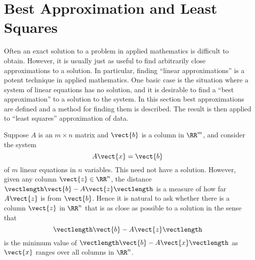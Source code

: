 \section{Best Approximation and Least Squares}
\label{sec:5_6}

Often an exact solution to a problem in applied mathematics is difficult to obtain. However, it is usually just as useful to find arbitrarily close approximations to a solution. In particular, finding ``linear approximations'' is a potent technique in applied mathematics. One basic case is the situation where a system of linear equations has no solution, and it is desirable to find a ``best approximation'' to a solution to the system. In this section best approximations are defined and a method for finding them is described. The result is then applied to ``least squares'' approximation of data.

Suppose $A$ is an $m \times n$ matrix and $\vect{b}$ is a column in $\RR^m$, and consider the system
\begin{equation*}
A\vect{x} = \vect{b}
\end{equation*}
of $m$ linear equations in $n$ variables. This need not have a solution. However, given any column $\vect{z} \in \RR^n$, the distance $\vectlength\vect{b} - A\vect{z}\vectlength$ is a measure of how far $A\vect{z}$ is from $\vect{b}$. Hence it is natural to ask whether there is a column $\vect{z}$ in $\RR^n$ that is as close as possible to a solution in the sense that
\begin{equation*}
\vectlength \vect{b} - A\vect{z} \vectlength
\end{equation*}
is the minimum value of $\vectlength\vect{b} - A\vect{x}\vectlength$ as $\vect{x}$ ranges over all columns in $\RR^n$.

